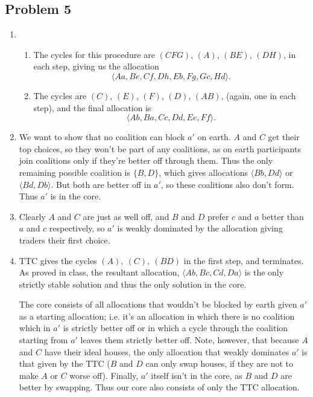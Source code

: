 \documentclass[11pt]{article}
\begin{document}
\subsection*{Problem 5}
\begin{enumerate}[label=(\alph*)]
\item
  \begin{enumerate}[label=(\roman*)]
  \item The cycles for this procedure are $(CFG)$, $(A)$, $(BE)$, $(DH)$,
    in each step, giving
    us the allocation \[\langle Aa, Be, Cf, Dh, Eb, Fg, Gc, Hd\rangle.\]
  \item  The cycles are $(C)$, $(E)$, $(F)$, $(D)$, $(AB)$, (again, one in each
    step), and the final
    allocation is \[\langle Ab, Ba, Cc, Dd, Ee, Ff\rangle.\]
  \end{enumerate}
\item We want to show that no coalition can block $a'$ on earth.
  $A$ and $C$ get their top choices, so they won't be part of any coalitions,
  as on earth participants join coalitions only if they're better off through
  them. Thus the only remaining possible coalition is $\{B,D\}$, which gives
  allocations $\langle Bb, Dd\rangle$ or $\langle Bd, Db\rangle$. But both
  are better off in $a'$, so these coalitions also don't form. Thus $a'$ is in
  the core.
\item Clearly $A$ and $C$ are just as well off, and $B$ and $D$ prefer $c$ and
  $a$ better than $a$ and $c$ respectively, so $a'$ is weakly dominated by the
  allocation giving traders their first choice.
\item TTC gives the cycles $(A),\ (C),\ (BD)$ in the first step, and terminates.
  As proved in class, the resultant allocation, $\langle Ab, Bc, Cd, Da\rangle$
  is the only strictly stable solution and thus the only solution in the core.

  The core consists of all allocations that wouldn't be blocked by earth given
  $a'$ as a starting allocation; i.e. it's an allocation in which there is no
  coalition which in $a'$ is strictly better off or in which a cycle through
  the coalition starting from $a'$ leaves them strictly better off. Note,
  however, that because $A$ and $C$ have their ideal houses, the only
  allocation that weakly dominates $a'$ is that given by the TTC
  ($B$ and $D$ can only swap houses, if they are not to make $A$ or $C$ worse
  off). Finally, $a'$ itself isn't in the core, as $B$ and $D$ are better by
  swapping. Thus our core also consists of only the TTC allocation.

\end{enumerate}
\end{document}

